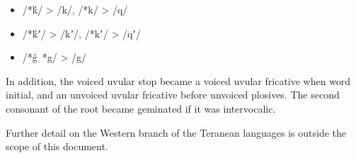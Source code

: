 \documentclass[grammar]{subfiles}
\begin{document}
\begin{itemize}
  \item /*ḱ/ > /k/, /*k/ > /q/
  \item /*ḱʼ/ > /kʼ/, /*kʼ/ > /qʼ/
  \item /*ǵ~*g/ > /g/
\end{itemize}

In addition, the voiced uvular stop became a voiced uvular fricative when word
initial, and an unvoiced uvular fricative before unvoiced plosives.  The second
consonant of the root became geminated if it was intervocalic.

Further detail on the Western branch of the Teranean languages is outside the
scope of this document.

%


%

\end{document}
